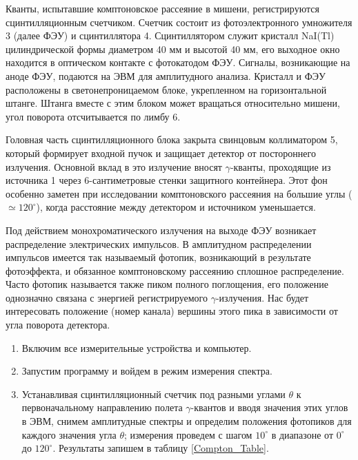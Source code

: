 	Кванты, испытавшие комптоновское рассеяние в мишени, регистрируются сцинтилляционным счетчиком. Счетчик состоит из фотоэлектронного умножителя 3 (далее ФЭУ) и сцинтиллятора 4. Сцинтиллятором служит
 	кристалл NaI(Tl) цилиндрической формы диаметром 40 мм и высотой 40 мм, его выходное окно находится в оптическом контакте с фотокатодом ФЭУ. Сигналы, возникающие на аноде ФЭУ, подаются на ЭВМ для амплитудного анализа. Кристалл и ФЭУ расположены в светонепроницаемом блоке, укрепленном на горизонтальной штанге. Штанга вместе с этим блоком может вращаться относительно мишени, угол поворота отсчитывается по лимбу 6.
 	
 	Головная часть сцинтилляционного блока закрыта свинцовым коллиматором 5, который формирует входной пучок и защищает детектор от постороннего излучения. Основной вклад в это излучение вносят $\gamma$-кванты, проходящие из источника 1 через 6-сантиметровые стенки защитного контейнера. Этот фон особенно заметен при исследовании комптоновского рассеяния на большие углы ($\simeq 120^\circ$), когда расстояние между детектором и источником уменьшается.

 	
 	
 	Под действием монохроматического излучения на выходе ФЭУ возникает распределение электрических импульсов. В амплитудном распределении импульсов имеется так называемый фотопик, возникающий в результате фотоэффекта, и обязанное комптоновскому рассеянию сплошное распределение. Часто фотопик называется также пиком полного поглощения, его положение однозначно связана с энергией регистрируемого $\gamma$-излучения.
Нас будет интересовать положение (номер канала) вершины этого пика в зависимости от угла поворота детектора.
	
	
	\begin{enumerate}
		\item Включим все измерительные устройства и компьютер.
		
		\item Запустим программу и войдем в режим измерения спектра.
		
		\item Устанавливая сцинтилляционный счетчик под разными углами $\theta$ к первоначальному направлению полета $\gamma$-квантов и вводя значения этих углов в ЭВМ, снимем амплитудные спектры и определим положения фотопиков для каждого значения угла $\theta$; измерения проведем с шагом $10^\circ$ в диапазоне от $0^\circ$ до $120^\circ$. Результаты запишем в таблицу \ref{Compton_Table}.
	\end{enumerate}


